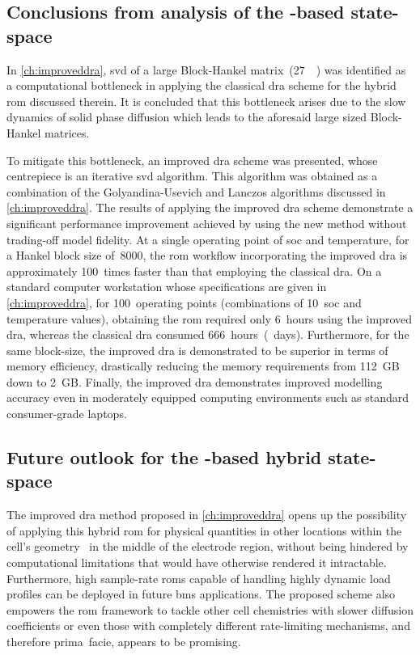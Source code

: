 \subsection{Conclusions from analysis of the -based state-space }
\addlines[0.5]

In \cref{ch:improveddra}, \gls{svd} of a large Block-Hankel
matrix~(\approx\SI{27}{\giga\byte}) was identified as a computational bottleneck
in applying the classical \gls{dra} scheme for the hybrid \gls{rom} discussed
therein. It is concluded that this bottleneck arises due  to the  slow dynamics
of  solid phase diffusion  which leads  to the aforesaid large sized
Block-Hankel matrices.

To mitigate this  bottleneck, an improved \gls{dra} scheme  was presented, whose
centrepiece is an iterative \gls{svd}  algorithm. This algorithm was obtained as
a  combination of  the Golyandina-Usevich  and Lanczos  algorithms discussed  in
\cref{ch:improveddra}.  The results  of applying  the improved  \gls{dra} scheme
demonstrate  a significant  performance improvement  achieved by  using the  new
method  without trading-off  model  fidelity.  At a  single  operating point  of
\gls{soc}  and temperature,  for  a  Hankel block  size  of~8000, the  \gls{rom}
workflow incorporating the improved  \gls{dra} is approximately 100~times faster
than that employing the classical  \gls{dra}. On a standard computer workstation
whose  specifications  are  given in  \cref{ch:improveddra},  for  100~operating
points  (combinations of  10~\gls{soc}  and temperature  values), obtaining  the
\gls{rom}  required  only 6~hours  using  the  improved \gls{dra},  whereas  the
classical \gls{dra}  consumed 666~hours~(~days). Furthermore,  for the
same block-size, the improved \gls{dra} is  demonstrated to be superior in terms
of memory efficiency,  drastically reducing the memory  requirements from 112~GB
down to  2~GB. Finally, the  improved \gls{dra} demonstrates  improved modelling
accuracy even  in moderately  equipped computing  environments such  as standard
consumer-grade laptops.

\subsection{Future outlook for the -based hybrid state-space }

The improved  \gls{dra} method  proposed in  \cref{ch:improveddra} opens  up the
possibility of  applying this hybrid \gls{rom}  for physical quantities in other
locations within the  cell's geometry \eg~in the  middle of the electrode
region,  without being hindered by  computational limitations that would  have
otherwise  rendered  it intractable.  Furthermore, high  sample-rate \glspl{rom}
capable of handling highly dynamic  load profiles can be deployed in future
\gls{bms} applications.  The proposed scheme also  empowers the \gls{rom}
framework to tackle other cell chemistries with slower diffusion coefficients or
even  those with  completely different  rate-limiting mechanisms,  and therefore
prima~facie, appears to be promising.


